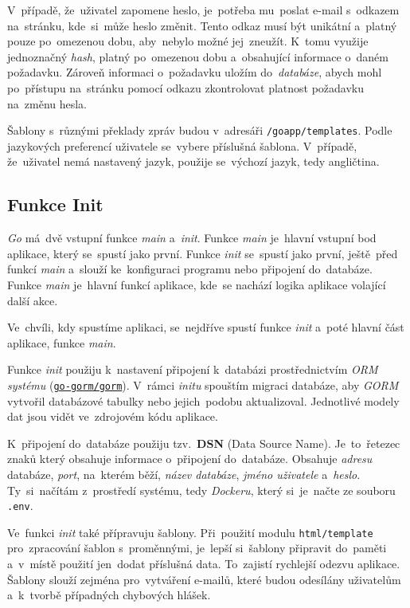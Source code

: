 \documentclass[11pt,a4paper]{report}
\begin{document}
            V~případě, že~uživatel zapomene heslo, je~potřeba mu~poslat e-mail s~odkazem na~stránku, kde~si~může heslo změnit. Tento odkaz musí být unikátní a~platný pouze po~omezenou dobu, aby~nebylo možné jej~zneužít. K~tomu využije jednoznačný \emph{hash}, platný po~omezenou dobu a~obsahující informace o~daném požadavku. Zároveň informaci o~požadavku uložím do~\emph{databáze}, abych mohl po~přístupu na~stránku pomocí odkazu zkontrolovat platnost požadavku na~změnu hesla.

            Šablony s~různými překlady zpráv budou v~adresáři \texttt{/goapp/templates}. Podle jazykových preferencí uživatele se~vybere příslušná šablona. V~případě, že~uživatel nemá nastavený jazyk, použije se~výchozí jazyk, tedy angličtina.
            
        \subsection{Funkce Init}
            \emph{Go} má~dvě vstupní funkce \emph{main} a~\emph{init}. Funkce \emph{main} je~hlavní vstupní bod aplikace, který se~spustí jako první. Funkce \emph{init} se~spustí jako první, ještě~před funkcí \emph{main} a~slouží ke~konfiguraci programu nebo připojení do~databáze. Funkce \emph{main} je~hlavní funkcí aplikace, kde~se nachází logika aplikace volající další akce.

            Ve~chvíli, kdy spustíme aplikaci, se~nejdříve spustí funkce \emph{init} a~poté hlavní část aplikace, funkce \emph{main}.
            
            Funkce \emph{init} použiju k~nastavení připojení k~databázi prostřednictvím \emph{ORM systému} (\href{https://gorm.io/}{\texttt{go-gorm/gorm}}). V~rámci \emph{initu} spouštím migraci databáze, aby \emph{GORM} vytvořil databázové tabulky nebo jejich~podobu aktualizoval. Jednotlivé modely dat jsou vidět ve~zdrojovém kódu aplikace.

            K~připojení do~databáze použiju tzv.~\textbf{DSN} (Data Source Name). Je~to~řetezec znaků který obsahuje informace o~připojení do~databáze. Obsahuje \emph{adresu} databáze, \emph{port}, na~kterém běží, \emph{název databáze}, \emph{jméno uživatele} a~\emph{heslo}. Ty~si~načítám z~prostředí systému, tedy \emph{Dockeru}, který si~je~načte ze souboru \texttt{.env}.

            Ve~funkci \emph{init} také přípravuju šablony. Při~použití modulu \texttt{html/template} pro~zpracování šablon s~proměnnými, je~lepší si~šablony připravit do~paměti a~v~místě použití jen~dodat příslušná data. To~zajistí rychlejší odezvu aplikace. Šablony slouží zejména pro~vytváření e-mailů, které budou odesílány uživatelům a~k~tvorbě případných chybových hlášek.
\end{document}
